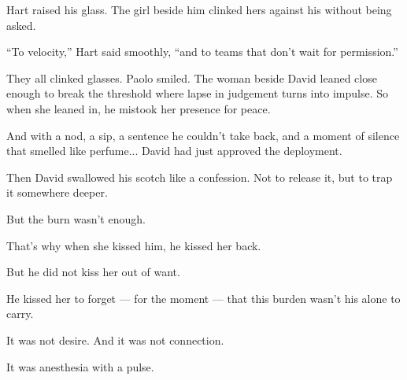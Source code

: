 Hart raised his glass. The girl beside him clinked hers against his without being asked.

“To velocity,” Hart said smoothly, “and to teams that don’t wait for permission.”

They all clinked glasses.  
Paolo smiled.  
The woman beside David leaned close enough to break the threshold where lapse in judgement 
turns into impulse. So when she leaned in, he mistook her presence for peace.

And with a nod, a sip, a sentence he couldn’t take back,  
and a moment of silence that smelled like perfume...
David had just approved the deployment.

Then David swallowed his scotch like a confession.
Not to release it, but to trap it somewhere deeper.

But the burn wasn’t enough.

That's why when she kissed him, he kissed her back.

But he did not kiss her out of want.

He kissed her to forget --- for the moment --- that this burden wasn’t his alone to carry.

It was not desire. And it was not connection. 

It was anesthesia with a pulse.

\medskip

